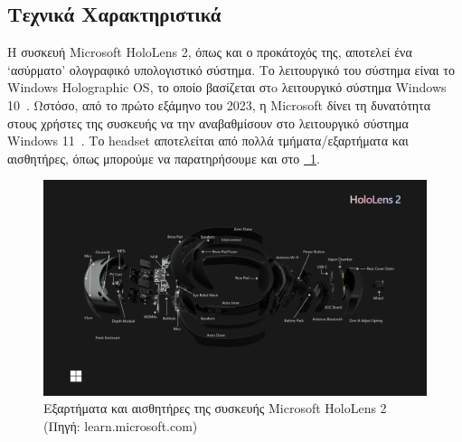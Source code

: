 \subsection{Τεχνικά Χαρακτηριστικά}\label{subsec:hololensSpecs}
Η συσκευή Microsoft HoloLens 2, όπως και ο προκάτοχός της, αποτελεί ένα `ασύρματο' ολογραφικό υπολογιστικό σύστημα. Το λειτουργικό του σύστημα είναι το Windows Holographic OS, το οποίο βασίζεται στo λειτουργικό σύστημα Windows 10~\cite{scooley_2023_hololens}. Ωστόσο, από το πρώτο εξάμηνο του 2023, η Microsoft δίνει τη δυνατότητα στους χρήστες της συσκευής να την αναβαθμίσουν στο λειτουργικό σύστημα Windows 11~\cite{seiler_2023_microsoft}. Το headset αποτελείται από πολλά τμήματα/εξαρτήματα και αισθητήρες, όπως μπορούμε να παρατηρήσουμε και στο \hyperref[fig:hololensDeviceParts]{\schema~\ref*{fig:hololensDeviceParts}}.
\begin{figure}[!ht]
    \centering
    \includegraphics[width=130mm]{images/microsoft_hololens_2_parts2.png}
    \caption[Εξαρτήματα και αισθητήρες της συσκευής Microsoft HoloLens 2]{Εξαρτήματα και αισθητήρες της συσκευής Microsoft HoloLens 2 {\footnotesize (Πηγή: learn.microsoft.com)}}\label{fig:hololensDeviceParts}
\end{figure}

